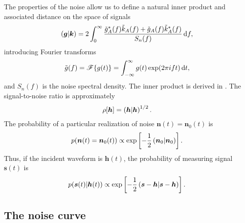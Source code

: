 The properties of the noise allow us to define a natural inner product and associated distance on the space of signals \citep{Cutler1994}
\begin{equation}
\left({\boldsymbol{g}}\middle|{\boldsymbol{k}}\right) = 2\int_{0}^{\infty}{\dfrac{\tilde{g}_A^\ast(f)\tilde{k}_A(f) + \tilde{g}_A(f)\tilde{k}_A^\ast(f)}{S_{n}(f)}}\,\mathrm{d}{f},
\label{eq:inner}
\end{equation}
introducing Fourier transforms
\begin{equation}
\tilde{g}(f) = \mathscr{F}\{g(t)\} = \int_{-\infty}^{\infty}{g(t)\exp(2\pi i ft)}\,\mathrm{d}{t},
\end{equation}
and $S_{n}(f)$ is the noise spectral density. The inner product is derived in . The signal-to-noise ratio is approximately
\begin{equation}
\rho[\boldsymbol{h}] = \left({\boldsymbol{h}}\middle|{\boldsymbol{h}}\right)^{1/2}.
\label{eq:SNR}
\end{equation}
The probability of a particular realization of noise $\boldsymbol{n}(t) = \boldsymbol{n}_0(t)$ is
\begin{equation}
p(\boldsymbol{n}(t) = \boldsymbol{n}_0(t)) \propto \exp\left[-\dfrac{1}{2}\left({\boldsymbol{n}_0}\middle|{\boldsymbol{n}_0}\right)\right].
\end{equation}
Thus, if the incident waveform is $\boldsymbol{h}(t)$, the probability of measuring signal $\boldsymbol{s}(t)$ is
\begin{equation}
p(\boldsymbol{s}(t)|\boldsymbol{h}(t)) \propto \exp\left[-\dfrac{1}{2}\left({\boldsymbol{s}-\boldsymbol{h}}\middle|{\boldsymbol{s}-\boldsymbol{h}}\right)\right].
\label{eq:sig_prob}
\end{equation}

\subsection{The noise curve}\label{sec:Noise}

